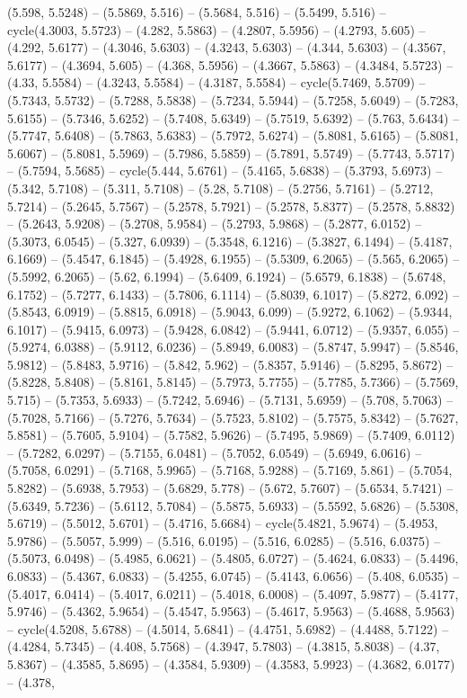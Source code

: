 (5.598, 5.5248) -- (5.5869, 5.516) -- (5.5684, 5.516) -- (5.5499, 5.516) -- cycle(4.3003, 5.5723) -- (4.282, 5.5863) -- (4.2807, 5.5956) -- (4.2793, 5.605) -- (4.292, 5.6177) -- (4.3046, 5.6303) -- (4.3243, 5.6303) -- (4.344, 5.6303) -- (4.3567, 5.6177) -- (4.3694, 5.605) -- (4.368, 5.5956) -- (4.3667, 5.5863) -- (4.3484, 5.5723) -- (4.33, 5.5584) -- (4.3243, 5.5584) -- (4.3187, 5.5584) -- cycle(5.7469, 5.5709) -- (5.7343, 5.5732) -- (5.7288, 5.5838) -- (5.7234, 5.5944) -- (5.7258, 5.6049) -- (5.7283, 5.6155) -- (5.7346, 5.6252) -- (5.7408, 5.6349) -- (5.7519, 5.6392) -- (5.763, 5.6434) -- (5.7747, 5.6408) -- (5.7863, 5.6383) -- (5.7972, 5.6274) -- (5.8081, 5.6165) -- (5.8081, 5.6067) -- (5.8081, 5.5969) -- (5.7986, 5.5859) -- (5.7891, 5.5749) -- (5.7743, 5.5717) -- (5.7594, 5.5685) -- cycle(5.444, 5.6761) -- (5.4165, 5.6838) -- (5.3793, 5.6973) -- (5.342, 5.7108) -- (5.311, 5.7108) -- (5.28, 5.7108) -- (5.2756, 5.7161) -- (5.2712, 5.7214) -- (5.2645, 5.7567) -- (5.2578, 5.7921) -- (5.2578, 5.8377) -- (5.2578, 5.8832) -- (5.2643, 5.9208) -- (5.2708, 5.9584) -- (5.2793, 5.9868) -- (5.2877, 6.0152) -- (5.3073, 6.0545) -- (5.327, 6.0939) -- (5.3548, 6.1216) -- (5.3827, 6.1494) -- (5.4187, 6.1669) -- (5.4547, 6.1845) -- (5.4928, 6.1955) -- (5.5309, 6.2065) -- (5.565, 6.2065) -- (5.5992, 6.2065) -- (5.62, 6.1994) -- (5.6409, 6.1924) -- (5.6579, 6.1838) -- (5.6748, 6.1752) -- (5.7277, 6.1433) -- (5.7806, 6.1114) -- (5.8039, 6.1017) -- (5.8272, 6.092) -- (5.8543, 6.0919) -- (5.8815, 6.0918) -- (5.9043, 6.099) -- (5.9272, 6.1062) -- (5.9344, 6.1017) -- (5.9415, 6.0973) -- (5.9428, 6.0842) -- (5.9441, 6.0712) -- (5.9357, 6.055) -- (5.9274, 6.0388) -- (5.9112, 6.0236) -- (5.8949, 6.0083) -- (5.8747, 5.9947) -- (5.8546, 5.9812) -- (5.8483, 5.9716) -- (5.842, 5.962) -- (5.8357, 5.9146) -- (5.8295, 5.8672) -- (5.8228, 5.8408) -- (5.8161, 5.8145) -- (5.7973, 5.7755) -- (5.7785, 5.7366) -- (5.7569, 5.715) -- (5.7353, 5.6933) -- (5.7242, 5.6946) -- (5.7131, 5.6959) -- (5.708, 5.7063) -- (5.7028, 5.7166) -- (5.7276, 5.7634) -- (5.7523, 5.8102) -- (5.7575, 5.8342) -- (5.7627, 5.8581) -- (5.7605, 5.9104) -- (5.7582, 5.9626) -- (5.7495, 5.9869) -- (5.7409, 6.0112) -- (5.7282, 6.0297) -- (5.7155, 6.0481) -- (5.7052, 6.0549) -- (5.6949, 6.0616) -- (5.7058, 6.0291) -- (5.7168, 5.9965) -- (5.7168, 5.9288) -- (5.7169, 5.861) -- (5.7054, 5.8282) -- (5.6938, 5.7953) -- (5.6829, 5.778) -- (5.672, 5.7607) -- (5.6534, 5.7421) -- (5.6349, 5.7236) -- (5.6112, 5.7084) -- (5.5875, 5.6933) -- (5.5592, 5.6826) -- (5.5308, 5.6719) -- (5.5012, 5.6701) -- (5.4716, 5.6684) -- cycle(5.4821, 5.9674) -- (5.4953, 5.9786) -- (5.5057, 5.999) -- (5.516, 6.0195) -- (5.516, 6.0285) -- (5.516, 6.0375) -- (5.5073, 6.0498) -- (5.4985, 6.0621) -- (5.4805, 6.0727) -- (5.4624, 6.0833) -- (5.4496, 6.0833) -- (5.4367, 6.0833) -- (5.4255, 6.0745) -- (5.4143, 6.0656) -- (5.408, 6.0535) -- (5.4017, 6.0414) -- (5.4017, 6.0211) -- (5.4018, 6.0008) -- (5.4097, 5.9877) -- (5.4177, 5.9746) -- (5.4362, 5.9654) -- (5.4547, 5.9563) -- (5.4617, 5.9563) -- (5.4688, 5.9563) -- cycle(4.5208, 5.6788) -- (4.5014, 5.6841) -- (4.4751, 5.6982) -- (4.4488, 5.7122) -- (4.4284, 5.7345) -- (4.408, 5.7568) -- (4.3947, 5.7803) -- (4.3815, 5.8038) -- (4.37, 5.8367) -- (4.3585, 5.8695) -- (4.3584, 5.9309) -- (4.3583, 5.9923) -- (4.3682, 6.0177) -- (4.378, 